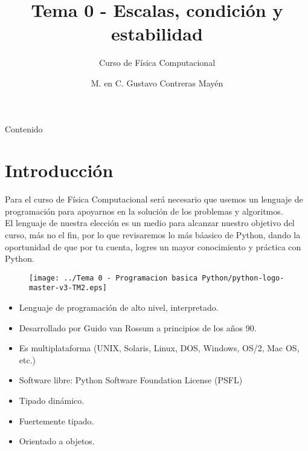 \documentclass[12pt]{beamer}
\title{Tema 0 - Escalas, condici\'{o}n y estabilidad}
\subtitle{Curso de F\'{i}sica Computacional}
\author{M. en C. Gustavo Contreras May\'{e}n}
\begin{document}
\maketitle
\fontsize{16}{16}\selectfont
{}
\begin{frame}{Contenido}
\tableofcontents[pausesections]
\end{frame}
\section{Introducci\'{o}n}
\begin{frame}
Para el curso de F\'{i}sica Computacional ser\'{a} necesario que usemos un lenguaje de programaci\'{o}n para apoyarnos en la soluci\'{o}n de los problemas y algoritmos.
\\
\bigskip
El lenguaje de nuestra elecci\'{o}n es un medio para alcanzar nuestro objetivo del curso, m\'{a}s no el fin, por lo que revisaremos lo m\'{a}s b\'{a}asico de Python, dando la oportunidad de que por tu cuenta, logres un mayor conocimiento y pr\'{a}ctica con Python.
\end{frame}
\begin{frame}
\begin{figure}
	\centering
	\texttt{[image: ../Tema 0 - Programacion basica Python/python-logo-master-v3-TM2.eps]} 
\end{figure}
\begin{itemize}
\item Lenguaje de programaci\'{o}n de alto nivel, interpretado.
\item Desarrollado por Guido van Rossum a principios de
los años 90.
\item Es multiplataforma (UNIX, Solaris, Linux, DOS, Windows, OS/2, Mac OS, etc.)
\item Software libre: Python Software Foundation License (PSFL)
\item Tipado din\'{a}mico.
\item Fuertemente tipado.
\item Orientado a objetos.
\end{itemize}
\end{frame}
\end{document}
